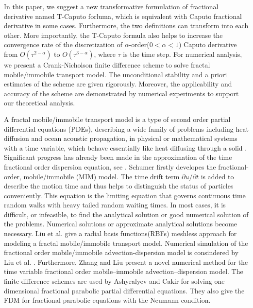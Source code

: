 \documentclass[3p,times]{elsarticle}
\begin{document}
In this paper, we suggest a new transformative formulation of fractional derivative named T-Caputo forluma, which is equivalent with Caputo fractional derivative in some cases. Furthermore, the two definitions can transform into each other. More importantly, the T-Caputo formula also helps to increase the convergence rate of the discretization of $\alpha$-order($0<\alpha<1$) Caputo derivative from $O(\tau^{2-\alpha})$ to $O(\tau^{3-\alpha})$, where $\tau$ is the time step. For numerical analysis, we present a Crank-Nicholson finite difference scheme to solve fractal mobile/immobile transport model. The unconditional stability and a priori estimates of the scheme are given rigorously. Moreover, the applicability and accuracy of the scheme are demonstrated by numerical experiments to support our theoretical analysis.

A fractal mobile/immobile transport model is a type of second order partial differential equations (PDEs), describing a wide family of problems including heat diffusion and ocean acoustic propagation, in physical or mathematical systems with a time variable, which behave essentially like heat diffusing through a solid \cite{atangana2013numerical}. Significant progress has already been made in the approximation of the time fractional order dispersion equation, see \cite{zhang2009time}. Schumer \cite{schumer2003fractal} firstly developes the fractional-order, mobile/immobile (MIM) model. The time drift term $\partial u/\partial t$ is added to describe the motion time and thus helps to distinguish the status of particles conveniently. This equation is the limiting equation that
governs continuous time random walks with heavy tailed random waiting times. In most cases, it is difficult, or infeasible, to find the analytical solution or good numerical solution of the problems. Numerical solutions or approximate analytical solutions become necessary.
Liu et al. \cite{liu2014rbf} give a radial basis functions(RBFs) meshless approach for modeling a fractal mobile/immobile transport model.
Numerical simulation of the fractional order mobile/immobile advection-dispersion model is consindered by Liu et al. \cite{liu2012numerical}. Furthermore, Zhang and Liu \cite{zhang2013novel} present a novel numerical method for the time variable fractional order mobile--immobile advection--dispersion model. The finite difference schemes are used by Ashyralyev and Cakir \cite{ashyralyev2012numerical} for solving one-dimensional fractional parabolic partial differential equations. They \cite{ashyralyev2013fdm} also give the FDM for fractional parabolic equations with the Neumann condition.
\end{document}
